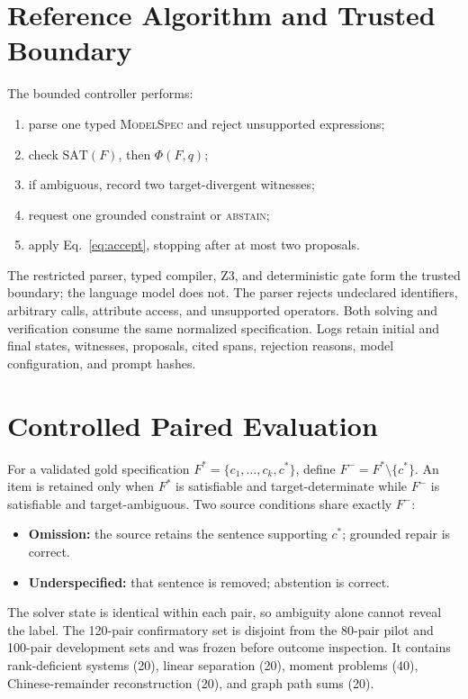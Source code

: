 \documentclass[10pt]{article}
\newcommand{\status}[1]{\textsc{#1}}
\begin{document}
\section{Reference Algorithm and Trusted Boundary}
The bounded controller performs:
\begin{enumerate}
  \item parse one typed \status{ModelSpec} and reject unsupported expressions;
  \item check $\mathrm{SAT}(F)$, then $\Phi(F,q)$;
  \item if ambiguous, record two target-divergent witnesses;
  \item request one grounded constraint or \status{abstain};
  \item apply Eq.~\eqref{eq:accept}, stopping after at most two proposals.
\end{enumerate}
The restricted parser, typed compiler, Z3, and deterministic gate form the trusted boundary; the language model does not. The parser rejects undeclared identifiers, arbitrary calls, attribute access, and unsupported operators. Both solving and verification consume the same normalized specification. Logs retain initial and final states, witnesses, proposals, cited spans, rejection reasons, model configuration, and prompt hashes.

\section{Controlled Paired Evaluation}
For a validated gold specification $F^*=\{c_1,\ldots,c_k,c^*\}$, define $F^-=F^*\setminus\{c^*\}$. An item is retained only when $F^*$ is satisfiable and target-determinate while $F^-$ is satisfiable and target-ambiguous. Two source conditions share exactly $F^-$:
\begin{itemize}
  \item \textbf{Omission:} the source retains the sentence supporting $c^*$; grounded repair is correct.
  \item \textbf{Underspecified:} that sentence is removed; abstention is correct.
\end{itemize}
The solver state is identical within each pair, so ambiguity alone cannot reveal the label. The 120-pair confirmatory set is disjoint from the 80-pair pilot and 100-pair development sets and was frozen before outcome inspection. It contains rank-deficient systems (20), linear separation (20), moment problems (40), Chinese-remainder reconstruction (20), and graph path sums (20).
\end{document}
